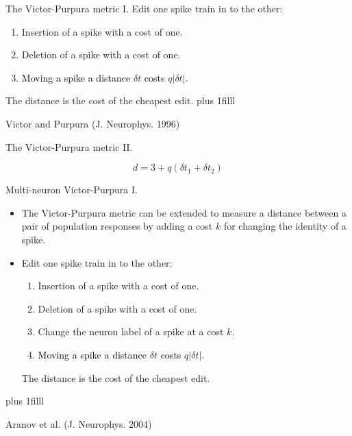\documentclass{beamer}
\newcommand{\btVFill}{\vskip0pt plus 1filll}
\begin{document}
\begin{frame}{The Victor-Purpura metric I.}
\color{black}Edit one spike train in to the other:
\begin{enumerate}
\item \color{black}Insertion of a spike with a cost of one.
\item \color{black}Deletion of a spike with a cost of one.
\item \color{dark}\textcolor{black}{Moving a spike a distance} $\delta t$ \textcolor{black}{costs} $q|\delta t|$.
\end{enumerate}
\color{black}The distance is the cost of the cheapest edit.
\btVFill
\begin{flushright}
\tiny{Victor and Purpura (J. Neurophys. 1996)}
\end{flushright}
\end{frame}


\begin{frame}{The Victor-Purpura metric II.}
\color{reddish}

\color{dark}
\[
d=3+q(\delta t_1+\delta t_2)
\]
\end{frame}

\begin{frame}{Multi-neuron Victor-Purpura I.}
\begin{itemize}
\item \color{black} The Victor-Purpura metric can be extended to measure a
distance between a pair of population responses by adding a cost
\color{dark}$k$\color{black}{} for changing the identity of a spike.
\item \color{black}Edit one spike train in to the other:
\begin{enumerate}
\item \color{black}Insertion of a spike with a cost of one.
\item \color{black}Deletion of a spike with a cost of one.
\item \color{black}Change the neuron label of a spike at a cost \textcolor{dark}{$k$}.
\item \color{dark}\textcolor{black}{Moving a spike a distance} $\delta t$ \textcolor{black}{costs} $q|\delta t|$.
\end{enumerate}
\color{black}The distance is the cost of the cheapest edit.
\end{itemize}
\btVFill
\begin{flushright}
\tiny{Aranov et al. (J. Neurophys. 2004)}
\end{flushright}
\end{frame}
\end{document}

